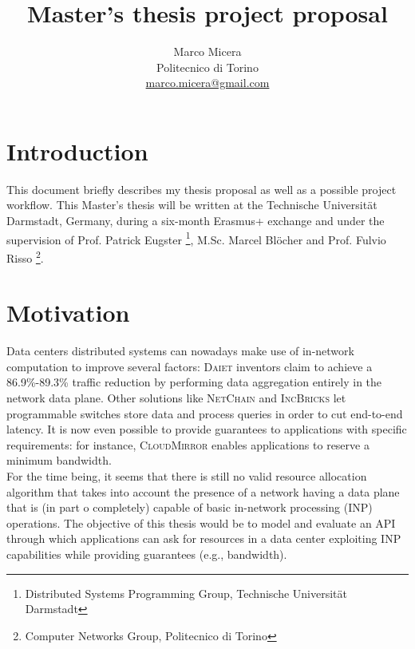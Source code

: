 \documentclass[letterpaper,twocolumn,10pt]{article}
\begin{document}
\title{Master's thesis project proposal}

\date{}

\author{
{   \rm Marco Micera}\\
    Politecnico di Torino\\
    \href{mailto:marco.micera@gmail.com}{marco.micera@gmail.com}
}
\maketitle


\section{Introduction}
This document briefly describes my thesis proposal as well as a possible project workflow. This Master's thesis will be written at the Technische Universit{\"a}t Darmstadt, Germany, during a six-month Erasmus+ exchange and under the supervision of Prof. Patrick Eugster \footnote[2]{\label{tuda} Distributed Systems Programming Group, Technische Universit{\"a}t Darmstadt}, M.Sc. Marcel Bl{\"o}cher  and Prof. Fulvio Risso \footnote[3]{\label{polito} Computer Networks Group, Politecnico di Torino}.

\section{Motivation} \label{motivation}
Data centers distributed systems can nowadays make use of in-network computation to improve several factors: \textsc{Daiet} \cite{daiet} inventors claim to achieve a 86.9\%-89.3\% traffic reduction by performing data aggregation entirely in the network data plane. Other solutions like \textsc{NetChain} \cite{netchain} and \textsc{IncBricks} \cite{incbricks} let programmable switches store data and process queries in order to cut end-to-end latency. It is now even possible to provide guarantees to applications with specific requirements: for instance, \textsc{CloudMirror} \cite{cloudmirror} enables applications to reserve a minimum bandwidth.\\ For the time being, it seems that there is still no valid resource allocation algorithm that takes into account the presence of a network having a data plane that is (in part o completely) capable of basic in-network processing (INP) operations. The objective of this thesis would be to model and evaluate an API through which applications can ask for resources in a data center exploiting INP capabilities while providing guarantees (e.g., bandwidth).
\end{document}
